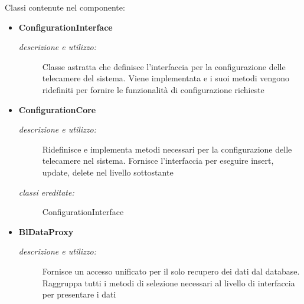 Classi contenute nel componente: 
\begin{itemize} 
\item \textbf{ConfigurationInterface}
\begin{description}
\item [\textit{descrizione e utilizzo:}] Classe astratta che definisce l'interfaccia per la configurazione delle telecamere del sistema. Viene implementata e i suoi metodi vengono ridefiniti per fornire le funzionalità di configurazione richieste
\end{description}
\item \textbf{ConfigurationCore}
\begin{description}
\item [\textit{descrizione e utilizzo:}] Ridefinisce e implementa metodi necessari per la configurazione delle telecamere nel sistema. Fornisce l'interfaccia per eseguire insert, update, delete nel livello sottostante
\item [\textit{classi ereditate:}] ConfigurationInterface
\end{description}
\item \textbf{BlDataProxy}
\begin{description}
\item [\textit{descrizione e utilizzo:}] Fornisce un accesso unificato per il solo recupero dei dati dal database. Raggruppa tutti i metodi di selezione necessari al livello di interfaccia per presentare i dati
\end{description}
\end{itemize}

